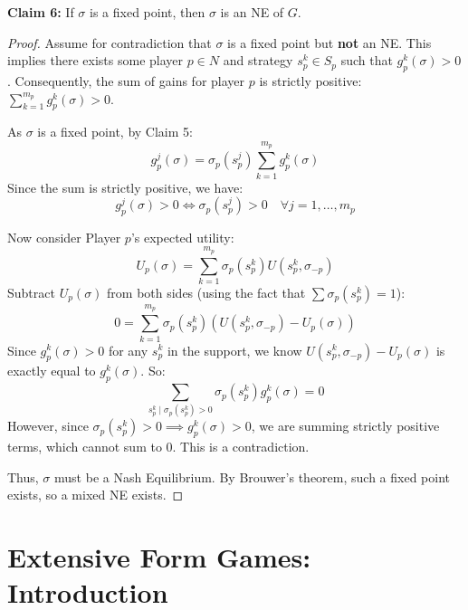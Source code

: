 \documentclass[12pt, a4paper]{article}
\begin{document}
\textbf{Claim 6:} If $\sigma$ is a fixed point, then $\sigma$ is an NE of $G$.
\begin{proof}
  Assume for contradiction that $\sigma$ is a fixed point but \textbf{not} an NE.
  This implies there exists some player $p \in N$ and strategy $s_p^k \in S_p$ such that $g_p^k(\sigma) > 0$.
  Consequently, the sum of gains for player $p$ is strictly positive: $\sum_{k=1}^{m_p} g_p^k(\sigma) > 0$.
  
  As $\sigma$ is a fixed point, by Claim 5:
  \[ g_p^j(\sigma) = \sigma_p(s_p^j) \sum_{k=1}^{m_p} g_p^k(\sigma) \]
  Since the sum is strictly positive, we have:
  \[ g_p^j(\sigma) > 0 \iff \sigma_p(s_p^j) > 0 \quad \forall j=1,\dots,m_p \]
  
  Now consider Player $p$'s expected utility:
  \[ U_p(\sigma) = \sum_{k=1}^{m_p} \sigma_p(s_p^k) U(s_p^k, \sigma_{-p}) \]
  Subtract $U_p(\sigma)$ from both sides (using the fact that $\sum \sigma_p(s_p^k) = 1$):
  \[ 0 = \sum_{k=1}^{m_p} \sigma_p(s_p^k) \left( U(s_p^k, \sigma_{-p}) - U_p(\sigma) \right) \]
  Since $g_p^k(\sigma) > 0$ for any $s_p^k$ in the support, we know $U(s_p^k, \sigma_{-p}) - U_p(\sigma)$ is exactly equal to $g_p^k(\sigma)$. So:
  \[ \sum_{s_p^k \mid \sigma_p(s_p^k) > 0} \sigma_p(s_p^k) g_p^k(\sigma) = 0 \]
  However, since $\sigma_p(s_p^k) > 0 \implies g_p^k(\sigma) > 0$, we are summing strictly positive terms, which cannot sum to 0. This is a contradiction. 
  
  Thus, $\sigma$ must be a Nash Equilibrium. By Brouwer's theorem, such a fixed point exists, so a mixed NE exists.
\end{proof}

\section{Extensive Form Games: Introduction}
\end{document}
